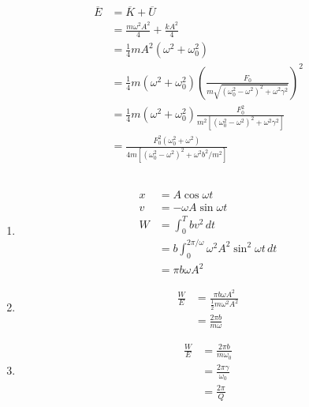 \documentclass{article}
\begin{document}
\begin{enumerate}
        \begin{align*}
          \overline{E} & = \overline{K} + \overline{U}                                                                                               \\
                       & = \frac{m \omega^2 A^2}{4} + \frac{k A^2}{4}                                                                                \\
                       & = \frac{1}{4} m A^2 (\omega^2 + \omega_0^2)                                                                                 \\
                       & = \frac{1}{4} m (\omega^2 + \omega_0^2) \left( \frac{F_0}{m \sqrt{(\omega_0^2 - \omega^2)^2 + \omega^2 \gamma^2}} \right)^2 \\
                       & = \frac{1}{4} m (\omega^2 + \omega_0^2) \frac{F_0^2}{m^2 [(\omega_0^2 - \omega^2)^2 + \omega^2 \gamma^2]}                   \\
                       & = \frac{F_0^2 (\omega_0^2 + \omega^2)}{4 m [(\omega_0^2 - \omega^2)^2 + \omega^2 b^2 / m^2]}
        \end{align*}
\end{enumerate}

\subsection{}

\begin{enumerate}
  \item

        \begin{align*}
          x & = A \cos \omega t                                             \\
          v & = -\omega A \sin \omega t                                     \\
          W & = \int_0^T b v^2 \,dt                                         \\
            & = b \int_0^{2 \pi / \omega} \omega^2 A^2 \sin^2 \omega t \,dt \\
            & = \pi b \omega A^2
        \end{align*}

  \item

        \begin{align*}
          \frac{W}{E} & = \frac{\pi b \omega A^2}{\frac{1}{2} m \omega^2 A^2} \\
                      & = \frac{2 \pi b}{m \omega}
        \end{align*}

  \item

        \begin{align*}
          \frac{W}{E} & = \frac{2 \pi b}{m \omega_0}    \\
                      & = \frac{2 \pi \gamma}{\omega_0} \\
                      & = \frac{2 \pi}{Q}
        \end{align*}
\end{enumerate}
\end{document}
